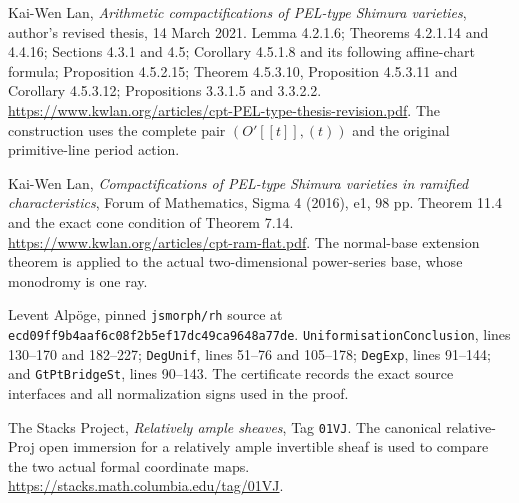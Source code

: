 Kai-Wen Lan, \emph{Arithmetic compactifications of PEL-type Shimura
varieties}, author's revised thesis, 14 March 2021.
Lemma 4.2.1.6; Theorems 4.2.1.14 and 4.4.16;
Sections 4.3.1 and 4.5; Corollary 4.5.1.8 and its following
affine-chart formula; Proposition 4.5.2.15;
Theorem 4.5.3.10, Proposition 4.5.3.11 and Corollary 4.5.3.12;
Propositions 3.3.1.5 and 3.3.2.2.
\url{https://www.kwlan.org/articles/cpt-PEL-type-thesis-revision.pdf}.
The construction uses the complete pair $(O'[[t]],(t))$ and
the original primitive-line period action.

Kai-Wen Lan, \emph{Compactifications of PEL-type Shimura varieties
in ramified characteristics}, Forum of Mathematics, Sigma 4 (2016),
e1, 98 pp.  Theorem 11.4 and the exact cone condition of
Theorem 7.14.
\url{https://www.kwlan.org/articles/cpt-ram-flat.pdf}.
The normal-base extension theorem is applied to the actual
two-dimensional power-series base, whose monodromy is one ray.

Levent Alp\"oge, pinned \texttt{jsmorph/rh} source at
\texttt{ecd09ff9b4aaf6c08f2b5ef17dc49ca9648a77de}.
\texttt{UniformisationConclusion}, lines 130--170 and 182--227;
\texttt{DegUnif}, lines 51--76 and 105--178;
\texttt{DegExp}, lines 91--144; and \texttt{GtPtBridgeSt},
lines 90--143.  The certificate records the exact source
interfaces and all normalization signs used in the proof.

The Stacks Project, \emph{Relatively ample sheaves},
Tag \texttt{01VJ}.  The canonical relative-Proj open immersion
for a relatively ample invertible sheaf is used to compare
the two actual formal coordinate maps.
\url{https://stacks.math.columbia.edu/tag/01VJ}.
